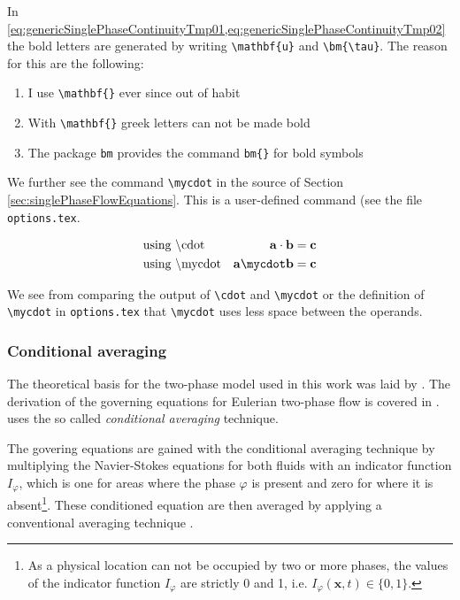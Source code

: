 In \cref{eq:genericSinglePhaseContinuityTmp01,eq:genericSinglePhaseContinuityTmp02} the bold letters 
are generated by writing \verb+\mathbf{u}+ and \verb+\bm{\tau}+. The reason for this are the 
following:

\begin{enumerate}
	\item I use \verb+\mathbf{}+ ever since out of habit
	\item With \verb+\mathbf{}+ greek letters can not be made bold
	\item The package \verb+bm+ provides the command \verb+bm{}+ for bold symbols
\end{enumerate}


We further see the command \verb+\mycdot+ in the source of Section \ref{sec:singlePhaseFlowEquations}. 
This is a user-defined command (see the file \verb+options.tex+.

\begin{align}
	&\text{using \textbackslash{}cdot} 		& \mathbf{a} \cdot \mathbf{b} &= \mathbf{c} \\
	&\text{using \textbackslash{}mycdot} 	& \mathbf{a} \mycdot \mathbf{b} &= \mathbf{c} \\
\end{align}

We see from comparing the output of \verb+\cdot+ and \verb+\mycdot+ or the definition of 
\verb+\mycdot+ in \verb+options.tex+ that \verb+\mycdot+ uses less space between the operands.




\subsubsection{Conditional averaging}

The theoretical basis for the two-phase model used in this work was laid by \citet{weller1993}. 
The derivation of the governing equations for Eulerian two-phase flow is covered in 
\cite{hill1998,rusche2002,openCFD2005}. \citet{weller1993} uses the so called 
\emph{conditional averaging} technique.

The govering equations are gained with the conditional averaging technique by multiplying 
the Navier-Stokes equations for both fluids with an indicator function $I_\varphi$, which is one 
for areas where the phase $\varphi$ is present and zero for where it is 
absent\footnote{As a physical location can not be occupied by two or more phases, the values 
of the indicator function $I_\varphi$ are strictly 0 and 1, i.e. $I_\varphi(\mathbf{x},t) \in \{0,1\}$.}. 
These conditioned equation are then averaged by applying a conventional averaging technique 
\cite{weller1993}.


